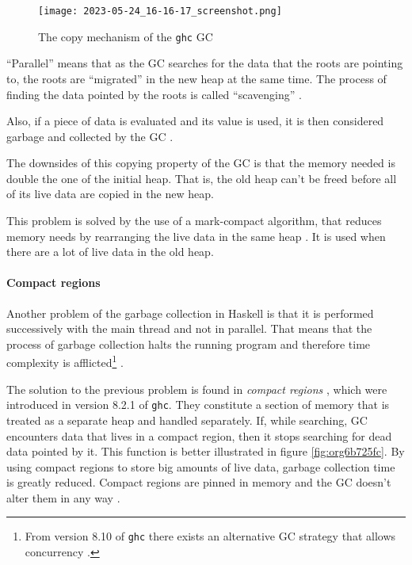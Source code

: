 \documentclass[a4paper, titlepage, twoside]{article}
\begin{document}
\begin{figure}[htbp]
\centering
\texttt{[image: 2023-05-24\_16-16-17\_screenshot.png]}
\caption{\label{fig:orgc17df00}The copy mechanism of the \texttt{ghc} GC \autocite{channableLessonsManagingHaskell}}
\end{figure}

``Parallel'' means that as the GC searches for the data that the roots are pointing to, the roots are ``migrated'' in the new heap at the same time. The process of finding the data pointed by the roots is called ``scavenging'' \autocite{yangHowGrinchStole}.

Also, if a piece of data is evaluated and its value is used, it is then considered garbage and collected by the GC \autocite{yangHowGrinchStole}.

The downsides of this copying property of the GC is that the memory needed is double the one of the initial heap. That is, the old heap  can't be freed before all of its live data are copied in the new heap.

This problem is solved by the use of a mark-compact algorithm, that reduces memory needs by rearranging the live data in the same heap \autocite{channableLessonsManagingHaskell}. It is used when there are a lot of live data in the old heap.

\paragraph*{Compact regions}
\label{sec:org299a960}

Another problem of the garbage collection in Haskell is that it is performed successively with the main thread and not in parallel. That means that the process of garbage collection halts the running program and therefore time complexity is afflicted\footnote{From version 8.10 of \texttt{ghc} there exists an alternative GC strategy that allows concurrency \autocite{gamari972ConcurrentGarbage2019}.} \autocite{channableLessonsManagingHaskell}.

The solution to the previous problem is found in \emph{compact regions} \autocite{yangEfficientCommunicationCollection2015}, which were introduced in version 8.2.1 of \texttt{ghc}. They constitute a section of memory that is treated as a separate heap and handled separately. If, while searching, GC encounters data that lives in a compact region, then it stops searching for dead data pointed by it. This function is better illustrated in figure \ref{fig:org6b725fc}. By using compact regions to store big amounts of live data, garbage collection time is greatly reduced. Compact regions are pinned in memory and the GC doesn't alter them in any way \autocite{channableLessonsManagingHaskell}.
\end{document}
